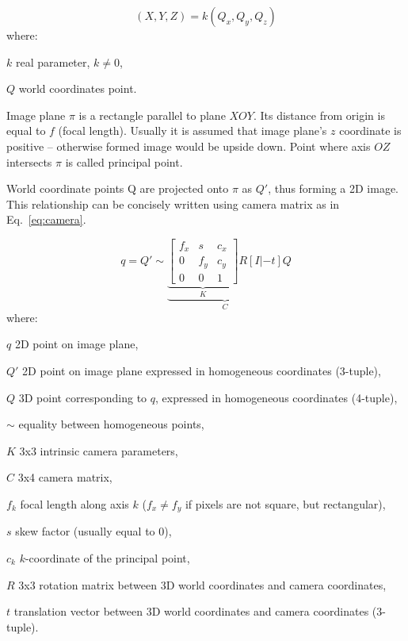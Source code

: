 \begin{equation}
(X, Y, Z) = k(Q_x, Q_y, Q_z)
\label{eq:homo}
\end{equation}
where:
\begin{eqwhere}[2cm]
	\item[$k$] real parameter, \(k \neq 0\),
	\item[$Q$] world coordinates point.
\end{eqwhere}

Image plane \(\pi\) is a rectangle parallel to plane \(XOY\). Its distance from origin is equal to \(f\) (focal length). Usually it is assumed that image plane's \(z\) coordinate is positive -- otherwise formed image would be upside down. Point where axis \(OZ\) intersects \(\pi\) is called principal point.

World coordinate points Q are projected onto \(\pi\) as \(Q'\), thus forming a 2D image. This relationship can be concisely written using camera matrix as in Eq.~\ref{eq:camera}.

\begin{equation}
q = Q' \sim \underbrace{ \underbrace{  \begin{bmatrix}
		f_{x} & s & c_{x} \\ 
		0 & f_{y} & c_{y} \\ 
		0 & 0 & 1
	\end{bmatrix}
}_{K} R \left [ I | -t \right ] }_{C} Q
\label{eq:camera}
\end{equation}
where:
\begin{eqwhere}[2cm]
	\item[$q$] 2D point on image plane,
	\item[$Q'$] 2D point on image plane expressed in homogeneous coordinates (3-tuple),
	\item[$Q$] 3D point corresponding to $q$, expressed in homogeneous coordinates (4-tuple),
	\item[$\sim$] equality between homogeneous points,
	\item[$K$] 3x3 intrinsic camera parameters,
	\item[$C$] 3x4 camera matrix,
	\item[$f_{k}$] focal length along axis $k$ ($f_{x} \neq f_{y}$ if pixels are not square, but rectangular),
	\item[$s$] skew factor (usually equal to 0),
	\item[$c_{k}$] $k$-coordinate of the principal point,
	\item[$R$] 3x3 rotation matrix between 3D world coordinates and camera coordinates,
	\item[$t$] translation vector between 3D world coordinates and camera coordinates (3-tuple).
\end{eqwhere}

